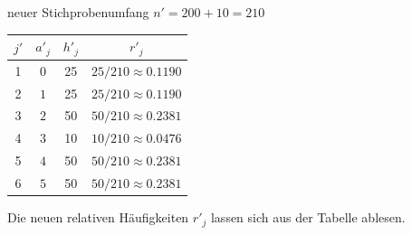 neuer Stichprobenumfang $n' = 200+10 = 210$

\begin{table}[H]
\centering
\begin{tabular}{c|cc|c}
    $j'$ & $a'_j$ & $h'_j$ & $r'_j$                  \\ \hline
    1    & $0$    & 25     & $25/210 \approx 0.1190$ \\
    2    & $1$    & 25     & $25/210 \approx 0.1190$ \\
    3    & $2$    & 50     & $50/210 \approx 0.2381$ \\
    4    & $3$    & 10     & $10/210 \approx 0.0476$ \\
    5    & $4$    & 50     & $50/210 \approx 0.2381$ \\
    6    & $5$    & 50     & $50/210 \approx 0.2381$
\end{tabular}
\end{table}

Die neuen relativen Häufigkeiten $r'_j$ lassen sich aus der Tabelle ablesen.
